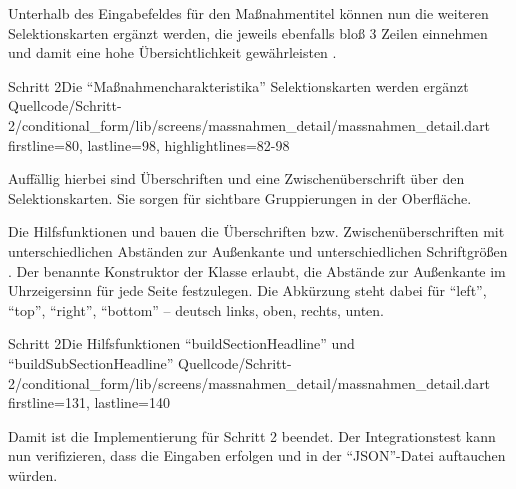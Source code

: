 Unterhalb des Eingabefeldes für den Maßnahmentitel können nun die weiteren Selektionskarten ergänzt werden, die jeweils ebenfalls bloß 3 Zeilen einnehmen und damit eine hohe Übersichtlichkeit gewährleisten .

\begin{alexlisting}{Schritt 2}{Die \enquote{Maßnahmencharakteristika} Selektionskarten werden ergänzt}
  {Quellcode/Schritt-2/conditional_form/lib/screens/massnahmen_detail/massnahmen_detail.dart}
  {firstline=80, lastline=98, highlightlines={82-98}}
  \label{lst:Schritt2MassnahmencharakteristikaSelektionskartenWerdenErgaenzt}
\end{alexlisting}

Auffällig hierbei sind Überschriften  und eine Zwischenüberschrift  über den Selektionskarten. Sie sorgen für sichtbare Gruppierungen in der Oberfläche.

Die Hilfsfunktionen 
und  bauen die Überschriften  bzw. Zwischenüberschriften  mit unterschiedlichen Abständen zur Außenkante 
und unterschiedlichen Schriftgrößen .
Der benannte Konstruktor  der Klasse  erlaubt, die Abstände zur Außenkante im Uhrzeigersinn für jede Seite festzulegen.
Die Abkürzung  steht dabei für \enquote{left}, \enquote{top}, \enquote{right}, \enquote{bottom} -- deutsch links, oben, rechts, unten.

\begin{alexlisting}{Schritt 2}{Die Hilfsfunktionen \enquote{buildSectionHeadline} und \enquote{buildSubSectionHeadline}}
  {Quellcode/Schritt-2/conditional_form/lib/screens/massnahmen_detail/massnahmen_detail.dart}
  {firstline=131, lastline=140}
  \label{lst:Schritt2buildSectionHeadlineBuildSubSectionHeadline}
\end{alexlisting}

Damit ist die Implementierung für Schritt 2 beendet.
Der Integrationstest kann nun verifizieren,
dass die Eingaben erfolgen und in der \enquote{JSON}-Datei auftauchen würden.

